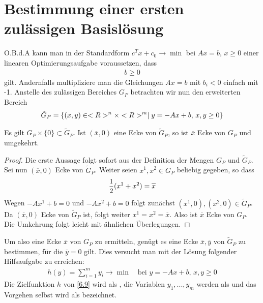 \section{Bestimmung einer ersten zulässigen Basislösung}

O.B.d.A kann man in der Standardform $c^Tx+c_0\to\min$ bei $Ax=b$, $x\ge 0$ einer linearen Optimierungsaufgabe voraussetzen, dass
\begin{align}
	\label{6.8}
	b\ge 0
\end{align}
gilt. Andernfalls multipliziere man die Gleichungen $Ax=b$ mit $b_i<0$ einfach mit -1. Anstelle des zulässigen Bereiches $G_P$ betrachten wir nun den erweiterten Bereich
\begin{align}
	\tilde{G}_P = \{(x,y)\in<R>^n\times<R>^m\mid y=-Ax+b,\, x,y\ge 0\}\notag
\end{align}

\begin{lemma}
	Es gilt $G_P\times \{0\}\subset\tilde{G}_P$. Ist $(\overline{x},0)$ eine Ecke von $\tilde{G}_P$, so ist $\overline{x}$ Ecke von $G_P$ und umgekehrt.
\end{lemma}
\begin{proof}
	Die erste Aussage folgt sofort aus der Definition der Mengen $G_P$ und $\tilde{G}_P$. Sei nun $(\overline{x},0)$ Ecke von $\tilde{G}_P$. Weiter seien $x^1,x^2\in G_P$ beliebig gegeben, so dass
	\begin{align}
		\frac{1}{2}(x^1+x^2) = \overline{x}\notag
	\end{align}
	Wegen $-Ax^1+b=0$ und $-Ax^2+b=0$ folgt zunächst $(x^1,0),(x^2,0)\in\tilde{G}_P$. Da $(\overline{x},0)$ Ecke von $\tilde{G}_P$ ist, folgt weiter $x^1=x^2=\overline{x}$. Also ist $\overline{x}$ Ecke von $G_P$. Die Umkehrung folgt leicht mit ähnlichen Überlegungen.
\end{proof}

Um also eine Ecke $\overline{x}$ von $G_P$ zu ermitteln, genügt es eine Ecke $\overline{x},\overline{y}$ von $\tilde{G}_P$ zu bestimmen, für die $\overline{y}=0$ gilt. Dies versucht man mit der Lösung folgender Hilfsaufgabe zu erreichen:
\begin{align}
	\label{6.9}
	h(y) = \sum_{i=1}^{m}y_i\to\min\quad\text{bei } y = -Ax+b,\, x,y\ge 0
\end{align}
Die Zielfunktion $h$ von \cref{6.9} wird als , die Variablen $y_1,...,y_m$ werden als  und das Vorgehen selbst wird als  bezeichnet.

